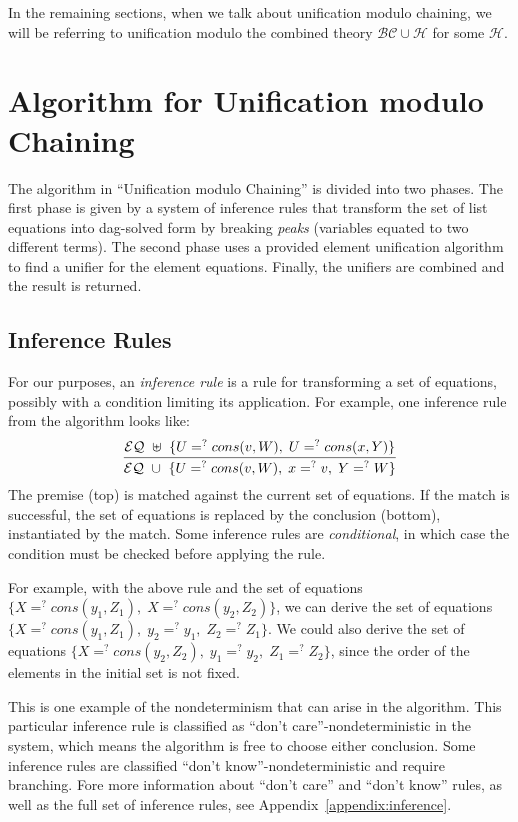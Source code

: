 \documentclass[11pt,twoside,titlepage]{article}
\newcommand{\ueq}{=_{}^?}
\newcommand{\BC}{\mathcal{BC}}
\newcommand{\HH}{\mathcal{H}}
\newcommand{\EQ}{\mathcal{EQ}}
\begin{document}
In the remaining sections, when we talk about unification modulo chaining,
we will be referring to unification modulo the combined theory $\BC \cup \HH$
for some $\HH$.

\section{Algorithm for Unification modulo Chaining}\label{section:algorithm}

The algorithm in ``Unification modulo Chaining'' is divided into two phases.
The first phase is given by a system of inference rules that transform the
set of list equations into dag-solved form by breaking \emph{peaks} (variables
equated to two different terms). The second phase uses a provided
element unification algorithm to find a unifier for the element equations.
Finally, the unifiers are combined and the result is returned.

\subsection{Inference Rules}\label{subsection:inference}

For our purposes, an \emph{inference rule} is a rule for transforming a set of
equations, possibly with a condition limiting its application. For example, one
inference rule from the algorithm looks like:
\[\infer
    {\EQ ~ \cup ~ \{ U \ueq cons(v, W), \; x \ueq v, \; Y \ueq W \}}
    {\EQ ~ \uplus ~ \{ U \ueq cons(v, W), \; U \ueq cons(x, Y) \}}
\]
The premise (top) is matched against the current set of equations. If the match
is successful, the set of equations is replaced by the conclusion (bottom),
instantiated by the match. Some inference rules are \emph{conditional}, in
which case the condition must be checked before applying the rule.

For example, with the above rule and
the set of equations $\{ X \ueq cons(y_1, Z_1), \; X \ueq cons(y_2, Z_2) \}$,
we can derive the set of equations $\{ X \ueq cons(y_1, Z_1), \; y_2 \ueq y_1,
\; Z_2 \ueq Z_1 \}$. We could also derive the set of equations $\{ X \ueq
cons(y_2, Z_2), \; y_1 \ueq y_2, \; Z_1 \ueq Z_2 \}$, since the order of the
elements in the initial set is not fixed.

This is one example of the nondeterminism that can arise in the algorithm.
This particular inference rule is classified as ``don't care''-nondeterministic
in the system, which means the algorithm is free to choose either conclusion.
Some inference rules are classified ``don't know''-nondeterministic and require
branching. Fore more information about ``don't care'' and ``don't know'' rules,
as well as the full set of inference rules, see
Appendix~\ref{appendix:inference}.
\end{document}
